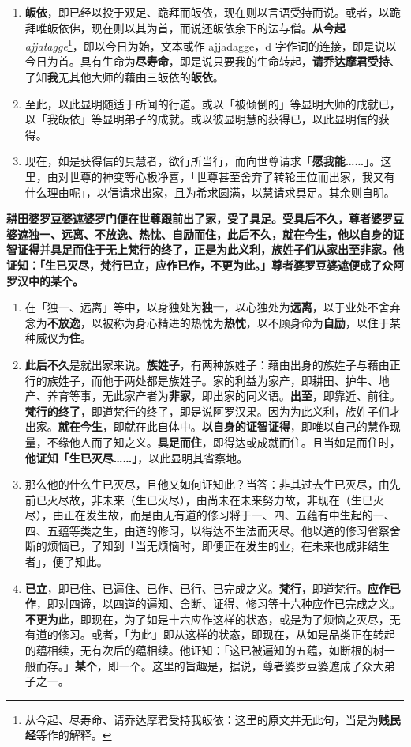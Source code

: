 \begin{enumerate}
\item \textbf{皈依}，即已经以投于双足、跪拜而皈依，现在则以言语受持而说。或者，以跪拜唯皈依佛，现在则以其为首，而说还皈依余下的法与僧。\textbf{从今起} \textit{ajjatagge}\footnote{从今起、尽寿命、请乔达摩君受持我皈依：这里的原文并无此句，当是为\textbf{贱民经}等作的解释。}，即以今日为始，文本或作 ajjadagge，d 字作词的连接，即是说以今日为首。具有生命为\textbf{尽寿命}，即是说只要我的生命转起，\textbf{请乔达摩君受持}、了知\textbf{我}无其他大师的藉由三皈依的\textbf{皈依}。
\item 至此，以此显明随适于所闻的行道。或以「被倾倒的」等显明大师的成就已，以「我皈依」等显明弟子的成就。或以彼显明慧的获得已，以此显明信的获得。
\item 现在，如是获得信的具慧者，欲行所当行，而向世尊请求「\textbf{愿我能……}」。这里，由对世尊的神变等心极净喜，「世尊甚至舍弃了转轮王位而出家，我又有什么理由呢」，以信请求出家，且为希求圆满，以慧请求具足。其余则自明。\end{enumerate}

\textbf{耕田婆罗豆婆遮婆罗门便在世尊跟前出了家，受了具足。受具后不久，尊者婆罗豆婆遮独一、远离、不放逸、热忱、自励而住，此后不久，就在今生，他以自身的证智证得并具足而住于无上梵行的终了，正是为此义利，族姓子们从家出至非家。他证知：「生已灭尽，梵行已立，应作已作，不更为此。」尊者婆罗豆婆遮便成了众阿罗汉中的某个。}

\begin{enumerate}\item 在「独一、远离」等中，以身独处为\textbf{独一}，以心独处为\textbf{远离}，以于业处不舍弃念为\textbf{不放逸}，以被称为身心精进的热忱为\textbf{热忱}，以不顾身命为\textbf{自励}，以住于某种威仪为\textbf{住}。
\item \textbf{此后不久}是就出家来说。\textbf{族姓子}，有两种族姓子：藉由出身的族姓子与藉由正行的族姓子，而他于两处都是族姓子。家的利益为家产，即耕田、护牛、地产、养育等事，无此家产者为\textbf{非家}，即出家的同义语。\textbf{出至}，即靠近、前往。\textbf{梵行的终了}，即道梵行的终了，即是说阿罗汉果。因为为此义利，族姓子们才出家。\textbf{就在今生}，即就在此自体中。\textbf{以自身的证智证得}，即唯以自己的慧作现量，不缘他人而了知之义。\textbf{具足而住}，即得达或成就而住。且当如是而住时，\textbf{他证知「生已灭尽……」}，以此显明其省察地。
\item 那么他的什么生已灭尽，且他又如何证知此？当答：非其过去生已灭尽，由先前已灭尽故，非未来（生已灭尽），由尚未在未来努力故，非现在（生已灭尽），由正在发生故，而是由无有道的修习将于一、四、五蕴有中生起的一、四、五蕴等类之生，由道的修习，以得达不生法而灭尽。他以道的修习省察舍断的烦恼已，了知到「当无烦恼时，即便正在发生的业，在未来也成非结生者」，便了知此。
\item \textbf{已立}，即已住、已遍住、已作、已行、已完成之义。\textbf{梵行}，即道梵行。\textbf{应作已作}，即对四谛，以四道的遍知、舍断、证得、修习等十六种应作已完成之义。\textbf{不更为此}，即现在，为了如是十六应作这样的状态，或是为了烦恼之灭尽，无有道的修习。或者，「为此」即从这样的状态，即现在，从如是品类正在转起的蕴相续，无有次后的蕴相续。他证知：「这已被遍知的五蕴，如断根的树一般而存。」\textbf{某个}，即一个。这里的旨趣是，据说，尊者婆罗豆婆遮成了众大弟子之一。\end{enumerate}

